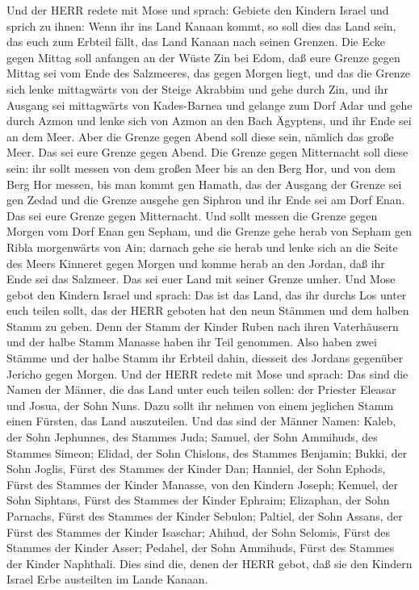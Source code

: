  Und der HERR redete mit Mose und sprach: 
Gebiete den Kindern Israel und sprich zu ihnen: Wenn ihr ins Land Kanaan
kommt, so soll dies das Land sein, das euch zum Erbteil fällt, das Land
Kanaan nach seinen Grenzen.  Die Ecke gegen Mittag soll
anfangen an der Wüste Zin bei Edom, daß eure Grenze gegen Mittag sei vom
Ende des Salzmeeres, das gegen Morgen liegt,  und das die
Grenze sich lenke mittagwärts von der Steige Akrabbim und gehe durch
Zin, und ihr Ausgang sei mittagwärts von Kades-Barnea und gelange zum
Dorf Adar und gehe durch Azmon  und lenke sich von Azmon an
den Bach Ägyptens, und ihr Ende sei an dem Meer.  Aber die
Grenze gegen Abend soll diese sein, nämlich das große Meer. Das sei eure
Grenze gegen Abend.  Die Grenze gegen Mitternacht soll diese
sein: ihr sollt messen von dem großen Meer bis an den Berg Hor,
 und von dem Berg Hor messen, bis man kommt gen Hamath, das
der Ausgang der Grenze sei gen Zedad  und die Grenze ausgehe
gen Siphron und ihr Ende sei am Dorf Enan. Das sei eure Grenze gegen
Mitternacht.  Und sollt messen die Grenze gegen Morgen vom
Dorf Enan gen Sepham,  und die Grenze gehe herab von Sepham
gen Ribla morgenwärts von Ain; darnach gehe sie herab und lenke sich an
die Seite des Meers Kinneret gegen Morgen  und komme herab
an den Jordan, daß ihr Ende sei das Salzmeer. Das sei euer Land mit
seiner Grenze umher.  Und Mose gebot den Kindern Israel und
sprach: Das ist das Land, das ihr durchs Los unter euch teilen sollt,
das der HERR geboten hat den neun Stämmen und dem halben Stamm zu geben.
 Denn der Stamm der Kinder Ruben nach ihren Vaterhäusern
und der halbe Stamm Manasse haben ihr Teil genommen.  Also
haben zwei Stämme und der halbe Stamm ihr Erbteil dahin, diesseit des
Jordans gegenüber Jericho gegen Morgen.  Und der HERR
redete mit Mose und sprach:  Das sind die Namen der Männer,
die das Land unter euch teilen sollen: der Priester Eleasar und Josua,
der Sohn Nuns.  Dazu sollt ihr nehmen von einem jeglichen
Stamm einen Fürsten, das Land auszuteilen.  Und das sind
der Männer Namen: Kaleb, der Sohn Jephunnes, des Stammes Juda;
 Samuel, der Sohn Ammihuds, des Stammes Simeon;
 Elidad, der Sohn Chislons, des Stammes Benjamin;
 Bukki, der Sohn Joglis, Fürst des Stammes der Kinder Dan;
 Hanniel, der Sohn Ephods, Fürst des Stammes der Kinder
Manasse, von den Kindern Joseph;  Kemuel, der Sohn
Siphtans, Fürst des Stammes der Kinder Ephraim;  Elizaphan,
der Sohn Parnachs, Fürst des Stammes der Kinder Sebulon; 
Paltiel, der Sohn Assans, der Fürst des Stammes der Kinder Isaschar;
 Ahihud, der Sohn Selomis, Fürst des Stammes der Kinder
Asser;  Pedahel, der Sohn Ammihuds, Fürst des Stammes der
Kinder Naphthali.  Dies sind die, denen der HERR gebot, daß
sie den Kindern Israel Erbe austeilten im Lande Kanaan.

